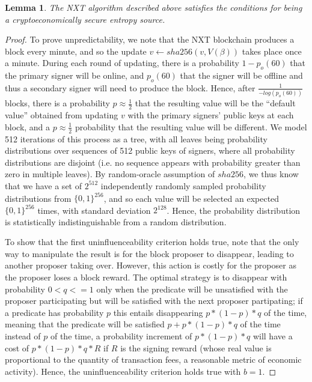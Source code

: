 \documentclass[11pt,a4paper]{article}
\makeatletter
\theoremstyle{plain}
\newtheorem{lem}[thm]{Lemma}
\theoremstyle{definition}
\theoremstyle{remark}
\newcommand{\ie}{i.e.\@\xspace}
\makeatother
\begin{document}
\begin{lem}
The NXT algorithm described above satisfies the conditions for being a cryptoeconomically secure entropy source.
\end{lem}
\begin{proof}
To prove unpredictability, we note that the NXT blockchain produces a block every minute, and so the update $v \leftarrow sha256(v, V(\beta))$ takes place once a minute. During each round of updating, there is a probability $1 - p_o(60)$ that the primary signer will be online, and $p_o(60)$ that the signer will be offline and thus a secondary signer will need to produce the block. Hence, after $\frac{1}{-log(p_o(60))}$ blocks, there is a probability $p \approx \frac{1}{2}$ that the resulting value will be the ``default value'' obtained from updating $v$ with the primary signers' public keys at each block, and a $p \approx \frac{1}{2}$ probability that the resulting value will be different. We model 512 iterations of this process as a tree, with all leaves being probability distributions over sequences of 512 public keys of signers, where all probability distributions are disjoint (\ie no sequence appears with probability greater than zero in multiple leaves). By random-oracle assumption of $sha256$, we thus know that we have a set of $2^{512}$ independently randomly sampled probability distributions from $\{0,1\}^{256}$, and so each value will be selected an expected $\{0,1\}^{256}$ times, with standard deviation $2^{128}$. Hence, the probability distribution is statistically indistinguishable from a random distribution.
 
To show that the first uninfluenceability criterion holds true, note that the only way to manipulate the result is for the block proposer to disappear, leading to another proposer taking over. However, this action is costly for the proposer as the proposer loses a block reward. The optimal strategy is to disappear with probability $0 < q <= 1$ only when the predicate will be unsatisfied with the proposer participating but will be satisfied with the next proposer partipating; if a predicate has probability $p$ this entails disappearing $p * (1-p) * q$ of the time, meaning that the predicate will be satisfied $p + p * (1-p) * q$ of the time instead of $p$ of the time, a probability increment of $p * (1-p) * q$ will have a cost of $p * (1-p) * q * R$ if $R$ is the signing reward (whose real value is proportional to the quantity of transaction fees, a reasonable metric of economic activity). Hence, the uninfluenceability criterion holds true with $b = 1$.


\end{proof}
\end{document}
